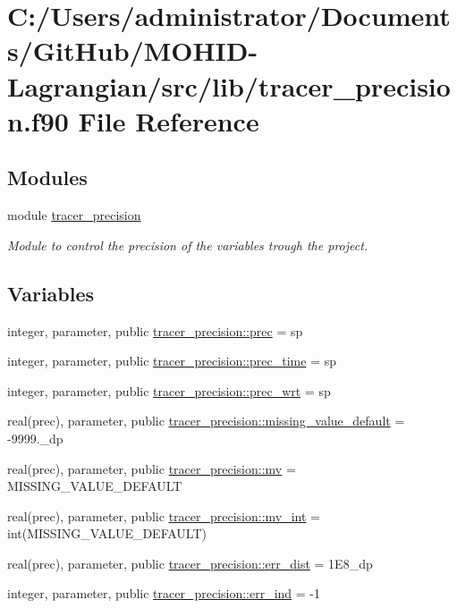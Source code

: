 \hypertarget{tracer__precision_8f90}{}\section{C\+:/\+Users/administrator/\+Documents/\+Git\+Hub/\+M\+O\+H\+I\+D-\/\+Lagrangian/src/lib/tracer\+\_\+precision.f90 File Reference}
\label{tracer__precision_8f90}
\subsection*{Modules}
\begin{DoxyCompactItemize}
\item 
module \mbox{\hyperlink{namespacetracer__precision}{tracer\+\_\+precision}}
\begin{DoxyCompactList}\small\item\em Module to control the precision of the variables trough the project. \end{DoxyCompactList}\end{DoxyCompactItemize}
\subsection*{Variables}
\begin{DoxyCompactItemize}
\item 
integer, parameter, public \mbox{\hyperlink{namespacetracer__precision_a8a01094f67c69ab389329d205a7c4cc6}{tracer\+\_\+precision\+::prec}} = sp
\item 
integer, parameter, public \mbox{\hyperlink{namespacetracer__precision_acd72fad1267e87137f00ec7d21d5a0cb}{tracer\+\_\+precision\+::prec\+\_\+time}} = sp
\item 
integer, parameter, public \mbox{\hyperlink{namespacetracer__precision_a57302c8b2d241e00360158d172f89d3c}{tracer\+\_\+precision\+::prec\+\_\+wrt}} = sp
\item 
real(prec), parameter, public \mbox{\hyperlink{namespacetracer__precision_ac24699f2eab5a0427f3ec0f8f7715a40}{tracer\+\_\+precision\+::missing\+\_\+value\+\_\+default}} = -\/9999.\+\_\+dp
\item 
real(prec), parameter, public \mbox{\hyperlink{namespacetracer__precision_a783785f78c8f38be24eef86ccd426c6e}{tracer\+\_\+precision\+::mv}} = M\+I\+S\+S\+I\+N\+G\+\_\+\+V\+A\+L\+U\+E\+\_\+\+D\+E\+F\+A\+U\+LT
\item 
real(prec), parameter, public \mbox{\hyperlink{namespacetracer__precision_abddd3613902872af708334a2c29dc468}{tracer\+\_\+precision\+::mv\+\_\+int}} = int(M\+I\+S\+S\+I\+N\+G\+\_\+\+V\+A\+L\+U\+E\+\_\+\+D\+E\+F\+A\+U\+LT)
\item 
real(prec), parameter, public \mbox{\hyperlink{namespacetracer__precision_ac58a793d67c36de01068a6315cb0211f}{tracer\+\_\+precision\+::err\+\_\+dist}} = 1\+E8\+\_\+dp
\item 
integer, parameter, public \mbox{\hyperlink{namespacetracer__precision_a8a4267e1aa9cc99d32b65d07cb31cb2a}{tracer\+\_\+precision\+::err\+\_\+ind}} = -\/1
\end{DoxyCompactItemize}
